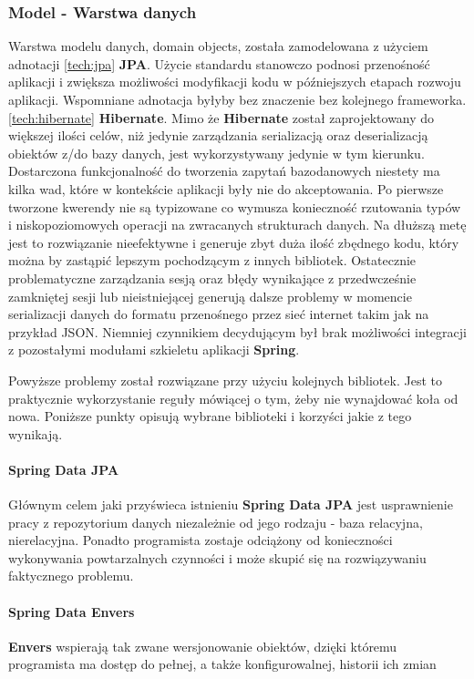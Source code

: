 		\subsubsection{Model - Warstwa danych}
			Warstwa modelu danych, domain objects, została zamodelowana z użyciem adnotacji \ref{tech:jpa} \textbf{JPA}. Użycie 
			standardu stanowczo podnosi przenośność aplikacji i zwiększa możliwości modyfikacji kodu w późniejszych
			etapach rozwoju aplikacji. Wspomniane adnotacja byłyby bez znaczenie bez kolejnego frameworka. \ref{tech:hibernate} \textbf{Hibernate}.
			Mimo że \textbf{Hibernate} został zaprojektowany do większej ilości celów, niż jedynie zarządzania serializacją oraz
			deserializacją obiektów z/do bazy danych, jest wykorzystywany jedynie w tym kierunku. Dostarczona funkcjonalność do tworzenia
			zapytań bazodanowych niestety ma kilka wad, które w kontekście aplikacji były nie do akceptowania. Po pierwsze tworzone
			kwerendy nie są typizowane co wymusza konieczność rzutowania typów i niskopoziomowych operacji na zwracanych strukturach
			danych. Na dłuższą metę jest to rozwiązanie nieefektywne i generuje zbyt duża ilość zbędnego kodu, który można by zastąpić
			lepszym pochodzącym z innych bibliotek. Ostatecznie problematyczne zarządzania sesją oraz błędy wynikające z przedwcześnie
			zamkniętej sesji lub nieistniejącej generują dalsze problemy w momencie serializacji danych do formatu przenośnego przez sieć
			internet takim jak na przykład JSON. Niemniej czynnikiem decydującym był brak możliwości integracji z pozostałymi modułami 
			szkieletu aplikacji \textbf{Spring}.
		
			Powyższe problemy został rozwiązane przy użyciu kolejnych bibliotek. Jest to praktycznie wykorzystanie reguły mówiącej o
			tym, żeby nie wynajdować koła od nowa. Poniższe punkty opisują wybrane biblioteki i korzyści jakie z tego wynikają.
			\paragraph{Spring Data JPA}
				Głównym celem jaki przyświeca istnieniu \textbf{Spring Data JPA} jest usprawnienie pracy z repozytorium danych niezależnie
				od jego rodzaju - baza relacyjna, nierelacyjna. Ponadto programista zostaje odciążony od konieczności wykonywania powtarzalnych
				czynności i może skupić się na rozwiązywaniu faktycznego problemu.
			\paragraph{Spring Data Envers}
				\textbf{Envers} wspierają tak zwane wersjonowanie obiektów, dzięki któremu programista ma dostęp do pełnej, a także konfigurowalnej, 
				historii ich zmian
